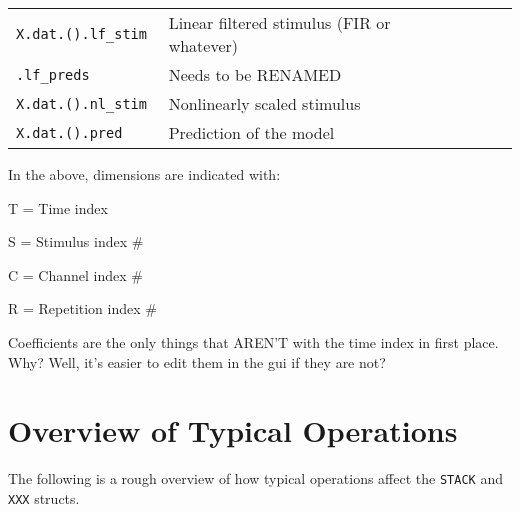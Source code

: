 \documentclass[letterpaper]{report}
\newcommand{\matlab}[1]{\texttt{#1}}
\begin{document}
\begin{tabular}{|l|l|l|l|l|}
\matlab{X{}.dat.().lf\_stim        } & Linear filtered stimulus (FIR or whatever)                   &         &                              &   \\
\matlab{.lf\_preds                 } & Needs to be RENAMED                                          &         &                              &   \\
\matlab{X{}.dat.().nl\_stim        } & Nonlinearly scaled stimulus                                  &         &                              &   \\
\matlab{X{}.dat.().pred           } & Prediction of the model &         &                              &   \\
\end{tabular}

In the above, dimensions are indicated with:

\begin{description}
  \item {T} = Time index 
  \item {S} = Stimulus index \#
  \item {C} = Channel index \#
  \item {R} = Repetition index \#
\end{description}


Coefficients are the only things that AREN'T with the time index in first place. Why? Well, it's easier to edit them in the gui if they are not?

\section{Overview of Typical Operations}

The following is a rough overview of how typical operations affect the \matlab{STACK} and \matlab{XXX} structs. 
\end{document}

